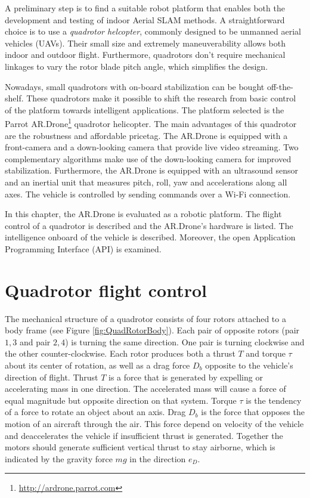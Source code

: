 A preliminary step is to find a suitable robot platform that enables both the development and testing of indoor Aerial SLAM methods.
A straightforward choice is to use a \textit{quadrotor helcopter}, commonly designed to be unmanned aerial vehicles (UAVs).
Their small size and extremely maneuverability allows both indoor and outdoor flight.
Furthermore, quadrotors don't require mechanical linkages to vary the rotor blade pitch angle, which simplifies the design.

Nowadays, small quadrotors with on-board stabilization can be bought off-the-shelf.
These quadrotors make it possible to shift the research from basic control of the platform towards intelligent applications.
The platform selected is the Parrot AR.Drone\footnote{\url{http://ardrone.parrot.com}} quadrotor helicopter.
The main advantages of this quadrotor are the robustness and affordable pricetag.
The AR.Drone is equipped with a front-camera and a down-looking camera that provide live video streaming.
Two complementary algorithms make use of the down-looking camera for improved stabilization.
Furthermore, the AR.Drone is equipped with an ultrasound sensor and an inertial unit that measures pitch, roll, yaw and accelerations along all axes.
The vehicle is controlled by sending commands over a Wi-Fi connection.

In this chapter, the AR.Drone is evaluated as a robotic platform.
The flight control of a quadrotor is described and the AR.Drone's hardware is listed.
The intelligence onboard of the vehicle is described.
Moreover, the open Application Programming Interface (API) is examined.


\section{Quadrotor flight control}
\label{sec:platform-quadrotor-flight-control}
The mechanical structure of a quadrotor consists of four rotors attached to a body frame (see Figure \ref{fig:QuadRotorBody}).
Each pair of opposite rotors (pair ${1, 3}$ and pair ${2, 4}$) is turning the same direction.
One pair is turning clockwise and the other counter-clockwise.
Each rotor produces both a thrust $T$ and torque $\tau$ about its center of rotation, as well as a drag force $D_b$ opposite to the vehicle's direction of flight.
Thrust $T$ is a force that is generated by expelling or accelerating mass in one direction.
The accelerated mass will cause a force of equal magnitude but opposite direction on that system.
Torque $\tau$ is the tendency of a force to rotate an object about an axis.
Drag $D_b$ is the force that opposes the motion of an aircraft through the air.
This force depend on velocity of the vehicle and deaccelerates the vehicle if insufficient thrust is generated.
Together the motors should generate sufficient vertical thrust to stay airborne, which is indicated by the gravity force $mg$ in the direction $e_D$.

